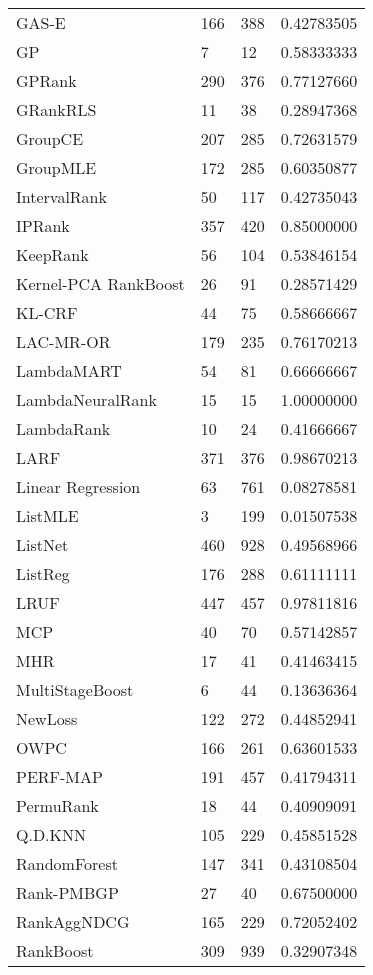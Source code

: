 \begin{longtable}{l|l|l|l}
GAS-E & 166 & 388 & 0.42783505 \\ 
\acs{GP} & 7 & 12 & 0.58333333 \\ 
\acs{GP}Rank & 290 & 376 & 0.77127660 \\ 
GRank\acs{RLS} & 11 & 38 & 0.28947368 \\ 
GroupCE & 207 & 285 & 0.72631579 \\ 
Group\acs{MLE} & 172 & 285 & 0.60350877 \\ 
IntervalRank & 50 & 117 & 0.42735043 \\ 
\acs{IP}Rank & 357 & 420 & 0.85000000 \\ 
KeepRank & 56 & 104 & 0.53846154 \\ 
Kernel-\acs{PCA} RankBoost & 26 &  91 & 0.28571429 \\ 
KL-\acs{CRF} &  44 & 75 & 0.58666667 \\ 
LAC-MR-OR & 179 & 235  & 0.76170213 \\ 
LambdaMART & 54 & 81 & 0.66666667 \\ 
LambdaNeuralRank & 15 & 15 & 1.00000000 \\ 
LambdaRank & 10 & 24 & 0.41666667 \\ 
LARF & 371 & 376 & 0.98670213 \\ 
Linear Regression & 63 & 761  & 0.08278581 \\ 
ListMLE & 3 & 199 & 0.01507538 \\ 
ListNet & 460 & 928 & 0.49568966 \\ 
ListReg & 176 & 288 & 0.61111111 \\ 
LRUF & 447 & 457 & 0.97811816 \\ 
MCP & 40 & 70 & 0.57142857 \\ 
MHR & 17 & 41 & 0.41463415 \\ 
MultiStageBoost & 6  & 44 & 0.13636364 \\ 
NewLoss & 122 & 272 & 0.44852941 \\ 
OWPC & 166 & 261 & 0.63601533 \\ 
PERF-\acs{MAP} & 191 & 457 & 0.41794311 \\ 
PermuRank & 18 & 44 & 0.40909091 \\ 
Q.D.\acs{KNN} & 105 & 229 & 0.45851528 \\ 
RandomForest & 147 & 341 & 0.43108504 \\ 
Rank-PMBGP & 27 & 40 & 0.67500000 \\ 
RankAgg\acs{NDCG} & 165 & 229 & 0.72052402 \\ 
RankBoost & 309 & 939 & 0.32907348 \\ 

\end{longtable}
